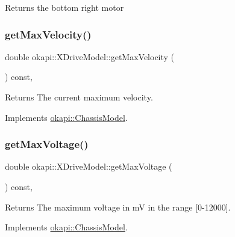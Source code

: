\begin{DoxyReturn}{Returns}
the bottom right motor 
\end{DoxyReturn}
\mbox{\label{classokapi_1_1XDriveModel_aa5b5c3431c99c612ade5c97858478828}} 
\subsubsection{\texorpdfstring{getMaxVelocity()}{getMaxVelocity()}}
{\footnotesize\ttfamily double okapi\+::\+X\+Drive\+Model\+::get\+Max\+Velocity (\begin{DoxyParamCaption}{ }\end{DoxyParamCaption}) const\hspace{0.3cm}{\ttfamily [override]}, {\ttfamily [virtual]}}

\begin{DoxyReturn}{Returns}
The current maximum velocity. 
\end{DoxyReturn}


Implements \mbox{\hyperlink{classokapi_1_1ChassisModel_ab45dd7430636ed1c1dee25dae6df5d46}{okapi\+::\+Chassis\+Model}}.

\mbox{\label{classokapi_1_1XDriveModel_a402487e35a717c47cfcc85ad1cfb0861}} 
\subsubsection{\texorpdfstring{getMaxVoltage()}{getMaxVoltage()}}
{\footnotesize\ttfamily double okapi\+::\+X\+Drive\+Model\+::get\+Max\+Voltage (\begin{DoxyParamCaption}{ }\end{DoxyParamCaption}) const\hspace{0.3cm}{\ttfamily [override]}, {\ttfamily [virtual]}}

\begin{DoxyReturn}{Returns}
The maximum voltage in mV in the range {\ttfamily \mbox{[}0-\/12000\mbox{]}}. 
\end{DoxyReturn}


Implements \mbox{\hyperlink{classokapi_1_1ChassisModel_a3ced2121524ae523592db64733c69472}{okapi\+::\+Chassis\+Model}}.

